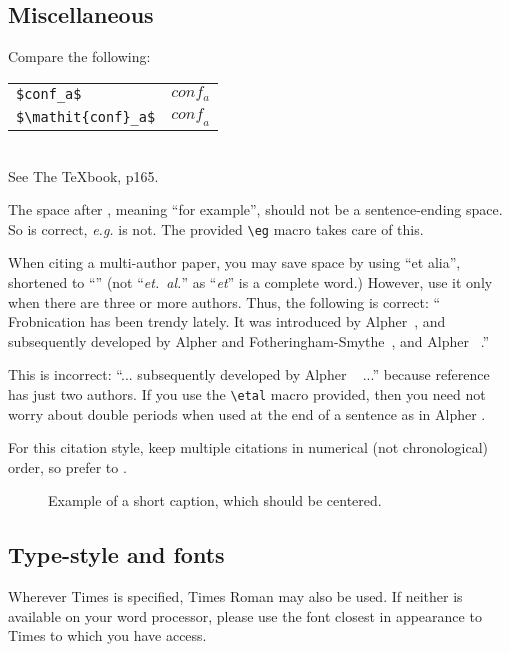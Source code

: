\documentclass[10pt,twocolumn,letterpaper]{article}
\begin{document}
\subsection{Miscellaneous}

\noindent
Compare the following:\\
\begin{tabular}{ll}
 \verb'$conf_a$' &  $conf_a$ \\
 \verb'$\mathit{conf}_a$' & $\mathit{conf}_a$ \end{tabular}\\
See The \TeX book, p165.

The space after \eg, meaning ``for example'', should not be a sentence-ending
space. So \eg is correct, {\em e.g.} is not.  The provided \verb'\eg' macro
takes care of this.

When citing a multi-author paper, you may save space by using ``et alia'',
shortened to ``\etal'' (not ``{\em et.\ al.}'' as ``{\em et}'' is a complete
word.) However, use it only when there are three or more authors.  Thus, the
following is correct: `` Frobnication has been trendy lately. It was introduced
by Alpher~\cite{Alpher02}, and subsequently developed by Alpher and
Fotheringham-Smythe~\cite{Alpher03}, and Alpher \etal~\cite{Alpher04}.''

This is incorrect: ``... subsequently developed by Alpher \etal~\cite{Alpher03}
...'' because reference~\cite{Alpher03} has just two authors.  If you use the
\verb'\etal' macro provided, then you need not worry about double periods when
used at the end of a sentence as in Alpher \etal.

For this citation style, keep multiple citations in numerical (not
chronological) order, so prefer \cite{Alpher03,Alpher02,Authors14} to
\cite{Alpher02,Alpher03,Authors14}.


\begin{figure*}
\begin{center}
\fbox{\rule{0pt}{2in} \rule{.9\linewidth}{0pt}}
\end{center}
   \caption{Example of a short caption, which should be centered.}
\label{fig:short}
\end{figure*}

\subsection{Type-style and fonts}

Wherever Times is specified, Times Roman may also be used. If neither is
available on your word processor, please use the font closest in appearance to
Times to which you have access.
\end{document}

